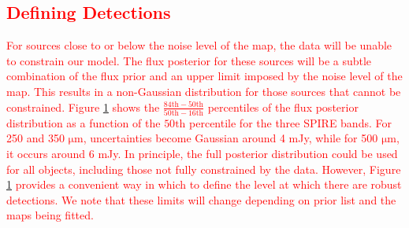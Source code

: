 \documentclass[useAMS,usenatbib]{mnras}
\begin{document}
\textcolor{red}{\subsection{Defining Detections}}\label{sec:dec}
\textcolor{red}{For sources close to or below the noise level of the map, the data will be unable to constrain our model. The flux posterior for these sources will be a subtle combination of the flux prior and an upper limit imposed by the noise level of the map. This results in a non-Gaussian distribution for those sources that cannot be constrained. Figure \ref{fig:detections} shows the $\frac{\mathrm{84th}-\mathrm{50th}}{\mathrm{50th-16th}}$ percentiles of the flux posterior distribution as a function of the $\mathrm{50th}$ percentile for the three SPIRE bands. For 250 and 350 $\mathrm{\mu m}$, uncertainties become Gaussian around 4 mJy, while for 500 $\mathrm{\mu m}$, it occurs around 6 mJy. In principle, the full posterior distribution could be used for all objects, including those not fully constrained by the data. However, Figure \ref{fig:detections} provides a convenient way in which to define the level at which there are robust detections. We note that these limits will change depending on prior list and the maps being fitted.}
\begin{figure}
\centering 
{}
\caption{}\label{fig:detections}
\end{figure}
\end{document}
